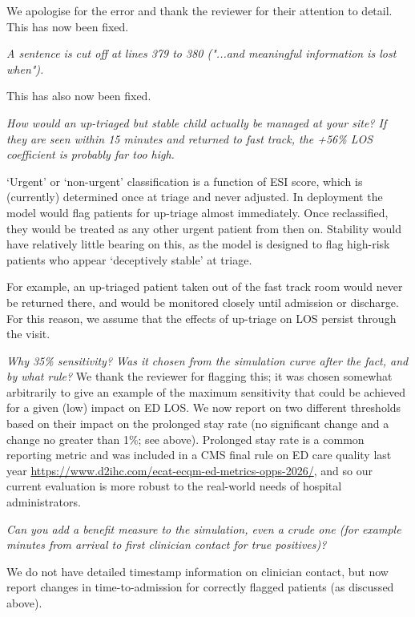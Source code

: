     We apologise for the error and thank the reviewer for their attention to detail. This has now been fixed.

\textit{     A sentence is cut off at lines 379 to 380 ("...and meaningful information is lost when").}

    This has also now been fixed.

\textit{     How would an up-triaged but stable child actually be managed at your site? If they are seen within 15 minutes and returned to fast track, the +56\% LOS coefficient is probably far too high.}

`Urgent' or `non-urgent' classification is a function of ESI score, which is (currently) determined once at triage and never adjusted. In deployment the model would flag patients for up-triage almost immediately. Once reclassified, they would be treated as any other urgent patient from then on. Stability would have relatively little bearing on this, as the model is designed to flag high-risk patients who appear `deceptively stable' at triage. 

For example, an up-triaged patient taken out of the fast track room would never be returned there, and would be monitored closely until admission or discharge. For this reason, we assume that the effects of up-triage on LOS persist through the visit.

\textit{     Why 35\% sensitivity? Was it chosen from the simulation curve after the fact, and by what rule?
}
We thank the reviewer for flagging this; it was chosen somewhat arbitrarily to give an example of the maximum sensitivity that could be achieved for a given (low) impact on ED LOS. We now report on two different thresholds based on their impact on the prolonged stay rate (no significant change and a change no greater than 1\%; see above). Prolonged stay rate is a common reporting metric and was included in a CMS final rule on ED care quality last year \url{https://www.d2ihc.com/ecat-ecqm-ed-metrics-opps-2026/}, and so our current evaluation is more robust to the real-world needs of hospital administrators.
    
\textit{     Can you add a benefit measure to the simulation, even a crude one (for example minutes from arrival to first clinician contact for true positives)?}

    We do not have detailed timestamp information on clinician contact, but now report changes in time-to-admission for correctly flagged patients (as discussed above).



